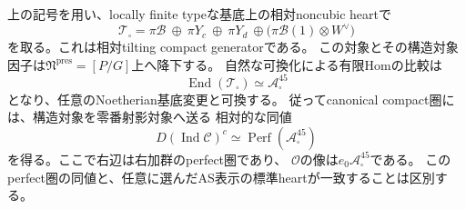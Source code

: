 \begin{proposition}
\label{prop:qa-symmetric-spinor-relative-tilting}
上の記号を用い、locally finite typeな基底上の相対noncubic heartで
\begin{equation}
 \mathcal T_\square
 =\pi\mathcal B\ \oplus\ \pi Y_c\ \oplus\ \pi Y_d\
       \oplus\bigl(\pi\mathcal B(1)\otimes W^\vee\bigr)
 \label{eq:qa-rank45-actual-spinor-generator}
\end{equation}
を取る。これは相対tilting compact generatorである。
この対象とその構造対象因子は$\mathfrak N^{\mathrm{pres}}=[P/G]$上へ降下する。
自然な可換化による有限Homの比較は
\begin{equation}
 \operatorname{End}(\mathcal T_\square)
       \simeq\mathcal A_\square^{45}
 \label{eq:qa-rank45-actual-spinor-end}
\end{equation}
となり、任意のNoetherian基底変更と可換する。
従ってcanonical compact圏には、構造対象を零番射影対象へ送る
相対的な同値
\begin{equation}
 D(\operatorname{Ind}\mathcal C)^c
       \simeq\operatorname{Perf}(\mathcal A_\square^{45})
 \label{eq:qa-rank45-intrinsic-perfect-equivalence}
\end{equation}
を得る。ここで右辺は右加群のperfect圏であり、
$\mathcal O$の像は$e_0\mathcal A_\square^{45}$である。
このperfect圏の同値と、任意に選んだAS表示の標準heartが一致することは区別する。
\end{proposition}
